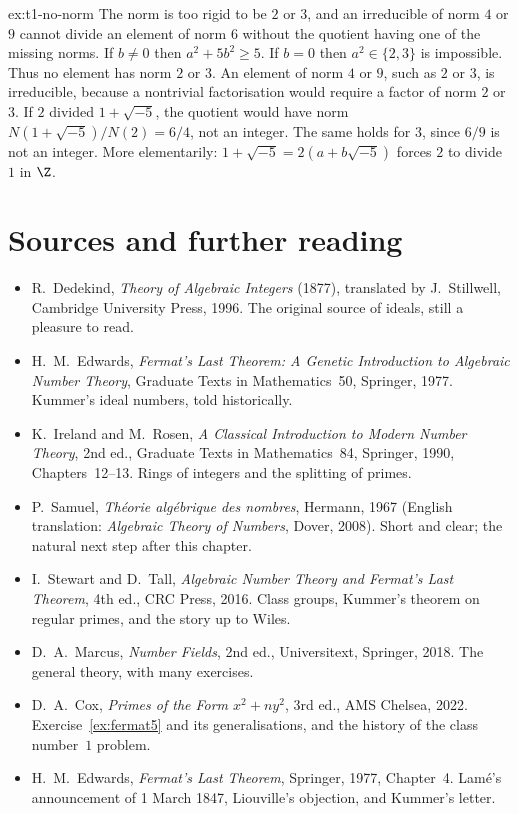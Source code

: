 \begin{solution}{ex:t1-no-norm}
\idea The norm is too rigid to be $2$ or $3$, and an irreducible of norm $4$ or $9$ cannot divide an element of norm $6$ without the quotient having one of the missing norms.
\writeup If $b\ne 0$ then $a^2+5b^2\ge 5$. If $b=0$ then $a^2\in\{2,3\}$ is impossible. Thus no element has norm $2$ or $3$. An element of norm $4$ or $9$, such as $2$ or $3$, is irreducible, because a nontrivial factorisation would require a factor of norm $2$ or $3$. If $2$ divided $1+\sqrt{-5}$, the quotient would have norm $N(1+\sqrt{-5})/N(2)=6/4$, not an integer. The same holds for $3$, since $6/9$ is not an integer. More elementarily: $1+\sqrt{-5}=2(a+b\sqrt{-5})$ forces $2$ to divide $1$ in $\Z$.
\end{solution}

\section*{Sources and further reading}

\begin{itemize}
\item R.~Dedekind, \emph{Theory of Algebraic Integers} (1877), translated by J.~Stillwell, Cambridge University Press, 1996. The original source of ideals, still a pleasure to read.
\item H.~M.~Edwards, \emph{Fermat's Last Theorem: A Genetic Introduction to Algebraic Number Theory}, Graduate Texts in Mathematics~50, Springer, 1977. Kummer's ideal numbers, told historically.
\item K.~Ireland and M.~Rosen, \emph{A Classical Introduction to Modern Number Theory}, 2nd ed., Graduate Texts in Mathematics~84, Springer, 1990, Chapters~12--13. Rings of integers and the splitting of primes.
\item P.~Samuel, \emph{Th\'eorie alg\'ebrique des nombres}, Hermann, 1967 (English translation: \emph{Algebraic Theory of Numbers}, Dover, 2008). Short and clear; the natural next step after this chapter.
\item I.~Stewart and D.~Tall, \emph{Algebraic Number Theory and Fermat's Last Theorem}, 4th ed., CRC Press, 2016. Class groups, Kummer's theorem on regular primes, and the story up to Wiles.
\item D.~A.~Marcus, \emph{Number Fields}, 2nd ed., Universitext, Springer, 2018. The general theory, with many exercises.
\item D.~A.~Cox, \emph{Primes of the Form $x^2+ny^2$}, 3rd ed., AMS Chelsea, 2022. Exercise~\ref{ex:fermat5} and its generalisations, and the history of the class number~$1$ problem.
\item H.~M.~Edwards, \emph{Fermat's Last Theorem}, Springer, 1977, Chapter~4. Lam\'e's announcement of 1 March 1847, Liouville's objection, and Kummer's letter.
\end{itemize}
